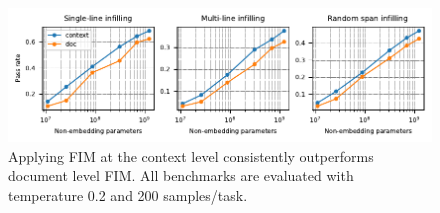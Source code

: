 \begin{figure}[ht!]
\centering
\includegraphics[width=\textwidth]{figures/doc-chunk-code-infilling-pass-rate.pdf}
\caption{
Applying FIM at the context level consistently outperforms document level FIM. All benchmarks are evaluated with temperature 0.2 and 200 samples/task.
}
\label{fig:pretraining:doc-context}
\end{figure}

